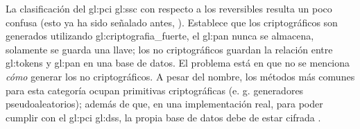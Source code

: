 

La clasificación del \gls{gl:pci} \gls{gl:ssc} con respecto a los reversibles
resulta un poco confusa (esto ya ha sido señalado antes, \cite{doc_sandra}).
Establece que los criptográficos son generados utilizando
\gls{gl:criptografia_fuerte}, el \gls{gl:pan} nunca se almacena, solamente se
guarda una llave; los no criptográficos guardan la relación entre
\glspl{gl:token} y \gls{gl:pan} en una base de datos. El problema está en que
no se menciona \textit{cómo} generar los no criptográficos. A pesar del nombre,
los métodos más comunes para esta categoría ocupan primitivas criptográficas
(e. g. generadores pseudoaleatorios); además de que, en una implementación
real, para poder cumplir con el \gls{gl:pci} \gls{gl:dss}, la propia base de
datos debe de estar cifrada \cite{pci_dss}.





